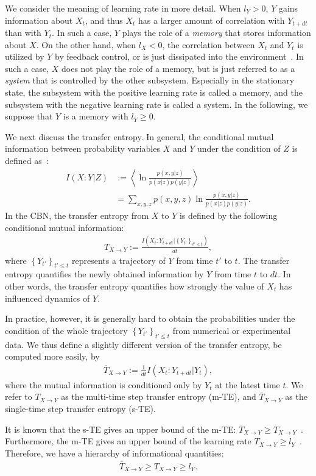 \documentclass[%
 reprint,
 amsmath,amssymb,
 aps,
]{revtex4-1}
\newcommand{\balign}[1]{\begin{align} #1 \end{align}}
\newcommand\mtr{T_{X\to Y}}
\newcommand\str{\overline{T}_{X\to Y}}
\theoremstyle{plain}
\begin{document}
We consider the meaning of learning rate in more detail. When $l_{Y}>0$, $Y$ gains information about $X_t$, and thus $X_t$ has a larger amount of correlation with $Y_{t+dt}$ than with $Y_t$. In such a case, $Y$ plays the role of a {\it memory} that stores information about $X$. On the other hand, when $l_X<0$, the correlation between $X_t$ and $Y_t$ is utilized by $Y$ by feedback control, or is just dissipated into the environment~\cite{Horowitz2014}. In such a case, $X$ does not play the role of a memory, but is just referred to as a {\it system} that is controlled by the other subsystem. Especially in the stationary state, the subsystem with the positive learning rate is called a memory, and the subsystem with the negative learning rate is called a system. In the following, we suppose that $Y$ is a memory with $l_Y\geq0$. 

We next discuss the transfer entropy. In general, the conditional mutual information between probability variables $X$ and $Y$ under the condition of $Z$ is defined as~\cite{Cover2006}:
\balign{
I(X:Y|Z)&:=\left<\ln\frac{p(x,y|z)}{p(x|z)p(y|z)}\right> \\
&=\sum_{x,y,z}p(x,y,z)\ln{\frac{p(x,y|z)}{p(x|z)p(y|z)}}.
}
In the CBN, the transfer entropy from $X$ to $Y$ is defined by the following conditional mutual information:
\balign{
\mtr:=\frac{I(X_t:Y_{t+dt}|\left\{Y_{t'}\right\}_{t'\leq t})}{dt},
}
where $\left\{ Y_{t'} \right\} _{t'\leq t}$ represents a trajectory of $Y$ from time $t'$ to $t$. The transfer entropy quantifies the newly obtained information by $Y$ from time $t$ to $dt$.  In other words, the transfer entropy quantifies how strongly the value of $X_t$ has influenced dynamics of $Y$. 

In practice, however, it is generally hard to obtain the probabilities under the condition of the whole trajectory $\left\{ Y_{t'} \right\} _{t'\leq t}$ from numerical or experimental data.
We thus define a slightly different version of the transfer entropy, be computed more easily, by 
\balign{
\str:=\frac{1}{dt}I(X_t:Y_{t+dt}|Y_t),
}
where the mutual information is conditioned only by $Y_t$ at the latest time $t$.
We refer to $\mtr$ as the multi-time step transfer entropy (m-TE), and $\str$ as the single-time step transfer entropy (s-TE).

It is known that the s-TE gives an upper bound of the m-TE: $\str\geq \mtr$~\cite{Hartich2014}. Furthermore, the m-TE gives an upper bound  of the learning rate $\mtr\geq l_{Y}$~\cite{Hartich2014,Hartich2016}. Therefore, we have a hierarchy of informational quantities:
\balign{
\str\geq \mtr\geq l_Y. \label{eq:bigger} 
}
\end{document}
